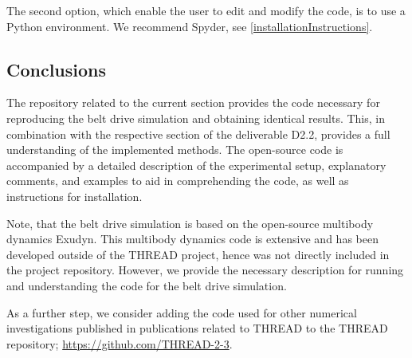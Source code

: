 The second option, which enable the user to edit and modify the code, is to use a Python environment. We recommend Spyder, see \ref{installationInstructions}.

\subsection{Conclusions}
The repository related to the current section provides the code necessary for reproducing the belt drive simulation and obtaining identical results. This, in combination with the respective section of the deliverable D2.2, provides a full understanding of the implemented methods. The open-source code is accompanied by a detailed description of the experimental setup, explanatory comments, and examples to aid in comprehending the code, as well as instructions for installation. 

Note, that the belt drive simulation is based on the open-source multibody dynamics Exudyn. This multibody dynamics code is extensive and has been developed outside of the THREAD project, hence was not directly included in the project repository. However, we provide the necessary description for running and understanding the code for the belt drive simulation.

As a further step, we consider adding the code used for other numerical investigations published in publications related to THREAD to the THREAD repository; \url{https://github.com/THREAD-2-3}.
